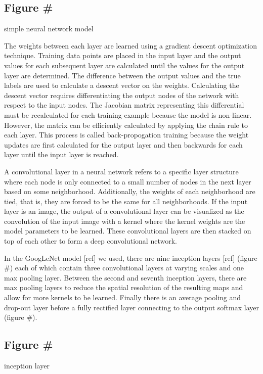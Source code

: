 \documentclass{article}
\begin{document}
\subsection{Figure \#}
simple neural network model

The weights between each layer are learned using a gradient descent optimization technique.
Training data points are placed in the input layer and the output values for each subsequent layer are calculated until the values for the output layer are determined.
The difference between the output values and the true labels are used to calculate a descent vector on the weights.
Calculating the descent vector requires differentiating the output nodes of the network with respect to the input nodes.
The Jacobian matrix representing this differential must be recalculated for each training example because the model is non-linear.
However, the matrix can be efficiently calculated by applying the chain rule to each layer.
This process is called back-propogation training because the weight updates are first calculated for the output layer and then backwards for each layer until the input layer is reached.

A convolutional layer in a neural network refers to a specific layer structure where each node is only connected to a small number of nodes in the next layer based on some neighborhood.
Additionally, the weights of each neighborhood are tied, that is, they are forced to be the same for all neighborhoods.
If the input layer is an image, the output of a convolutional layer can be visualized as the convolution of the input image with a kernel where the kernel weights are the model parameters to be learned.
These convolutional layers are then stacked on top of each other to form a deep convolutional network.

In the GoogLeNet model [ref] we used, there are nine inception layers [ref] (figure \#) each of which contain three convolutional layers at varying scales and one max pooling layer.
Between the second and seventh inception layers, there are max pooling layers to reduce the spatial resolution of the resulting maps and allow for more kernels to be learned.
Finally there is an average pooling and drop-out layer before a fully rectified layer connecting to the output softmax layer (figure \#).

\subsection{Figure \#}
inception layer
\end{document}
